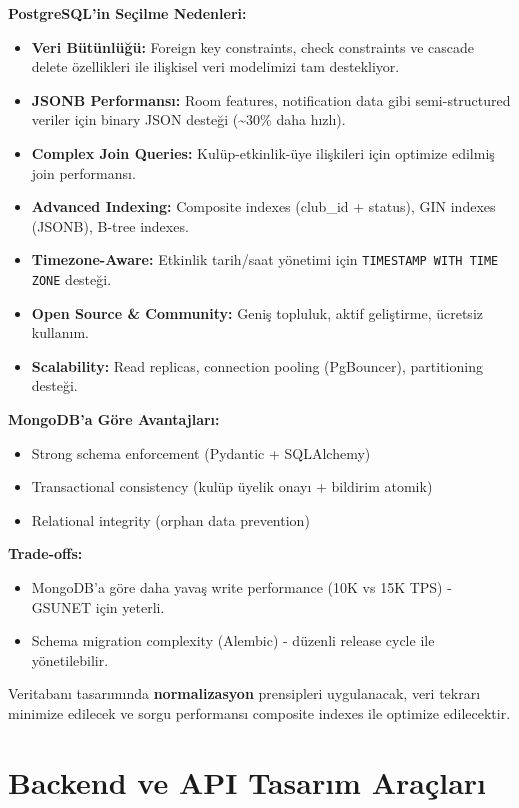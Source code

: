 \documentclass[a4paper,12pt]{report}
\begin{document}
\textbf{PostgreSQL'in Seçilme Nedenleri:}

\begin{itemize}
    \item \textbf{Veri Bütünlüğü:} Foreign key constraints, check constraints ve cascade delete özellikleri ile ilişkisel veri modelimizi tam destekliyor.
    \item \textbf{JSONB Performansı:} Room features, notification data gibi semi-structured veriler için binary JSON desteği (\textasciitilde{}30\% daha hızlı).
    \item \textbf{Complex Join Queries:} Kulüp-etkinlik-üye ilişkileri için optimize edilmiş join performansı.
    \item \textbf{Advanced Indexing:} Composite indexes (club\_id + status), GIN indexes (JSONB), B-tree indexes.
    \item \textbf{Timezone-Aware:} Etkinlik tarih/saat yönetimi için \texttt{TIMESTAMP WITH TIME ZONE} desteği.
    \item \textbf{Open Source \& Community:} Geniş topluluk, aktif geliştirme, ücretsiz kullanım.
    \item \textbf{Scalability:} Read replicas, connection pooling (PgBouncer), partitioning desteği.
\end{itemize}

\textbf{MongoDB'a Göre Avantajları:}
\begin{itemize}
    \item Strong schema enforcement (Pydantic + SQLAlchemy)
    \item Transactional consistency (kulüp üyelik onayı + bildirim atomik)
    \item Relational integrity (orphan data prevention)
\end{itemize}

\textbf{Trade-offs:}
\begin{itemize}
    \item MongoDB'a göre daha yavaş write performance (10K vs 15K TPS) - GSUNET için yeterli.
    \item Schema migration complexity (Alembic) - düzenli release cycle ile yönetilebilir.
\end{itemize}

Veritabanı tasarımında \textbf{normalizasyon} prensipleri uygulanacak, veri tekrarı minimize edilecek ve sorgu performansı composite indexes ile optimize edilecektir.

\section{Backend ve API Tasarım Araçları}
\end{document}

